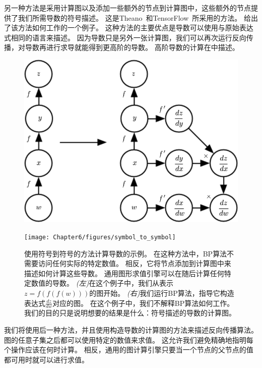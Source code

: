 另一种方法是采用计算图以及添加一些额外的节点到计算图中，这些额外的节点提供了我们所需导数的符号描述。
这是Theano~\citep{Bergstra-et-al-2010,Bastien-et-al-2012}和TensorFlow~\citep{Abadi-et-al-2015}所采用的方法。
给出了该方法如何工作的一个例子。
这种方法的主要优点是导数可以使用与原始表达式相同的语言来描述。
因为导数只是另外一张计算图，我们可以再次运行反向传播，对导数再进行求导就能得到更高阶的导数。
高阶导数的计算在中描述。
\begin{figure}[!htb]
\ifOpenSource
\centerline{\includegraphics[scale=0.5]{images/52.png}}
\else
\centerline{\texttt{[image: Chapter6/figures/symbol\_to\_symbol]}}
\fi
\captionsetup{singlelinecheck=off}
\caption{使用符号到符号的方法计算导数的示例。
在这种方法中，\gls{BP}算法不需要访问任何实际的特定数值。
相反，它将节点添加到计算图中来描述如何计算这些导数。
通用图形求值引擎可以在随后计算任何特定数值的导数。
\emph{(左)}在这个例子中，我们从表示$z=f(f(f(w)))$的图开始。
\emph{(右)}我们运行\gls{BP}算法，指导它构造表达式$\frac{dz}{dw}$对应的图。 在这个例子中，我们不解释\gls{BP}算法如何工作。
我们的目的只是说明想要的结果是什么：符号描述的导数的计算图。}
\label{fig:chap6_symbol_to_symbol}
\end{figure}

我们将使用后一种方法，并且使用构造导数的计算图的方法来描述反向传播算法。
图的任意子集之后都可以使用特定的数值来求值。
这允许我们避免精确地指明每个操作应该在何时计算。
相反，通用的图计算引擎只要当一个节点的父节点的值都可用时就可以进行求值。

  
